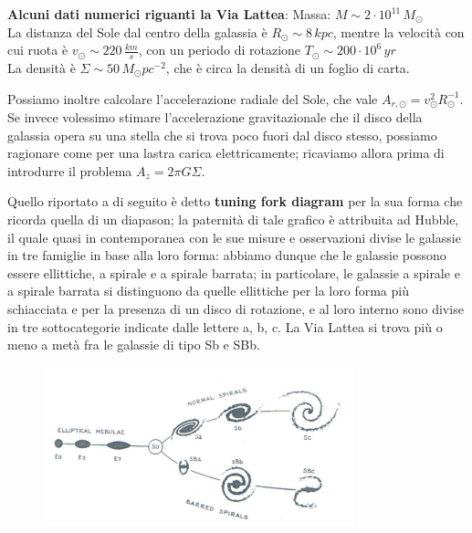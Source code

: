 \begin{minipage}{.65\textwidth}
\textbf{Alcuni dati numerici riguanti la Via Lattea}:
Massa: $M \sim 2 \cdot 10^{11} \, M_{\odot}$\\
La distanza del Sole dal centro della galassia è $R_{\odot} \sim 8 \, kpc$, mentre la velocità con cui ruota è $v_{\odot} \sim 220 \, \frac{km}{s}$, con un periodo di rotazione $T_{\odot} \sim 200 \cdot 10^6 \, yr$\\
La densità è $\Sigma \sim 50 \, M_{\odot}pc^{-2}$, che è circa la densità di un foglio di carta.\\
\end{minipage}

\vspace{0.2cm}

Possiamo inoltre calcolare l'accelerazione radiale del Sole, che vale $A_{r, \odot}= v_{\odot}^2 R_{\odot}^{-1}$. Se invece volessimo stimare l'accelerazione gravitazionale che il disco della galassia opera su una stella che si trova poco fuori dal disco stesso, possiamo ragionare come per una lastra carica elettricamente; ricaviamo allora prima di introdurre il problema $A_z = 2 \pi G \Sigma$.

Quello riportato a di seguito è detto \textbf{tuning fork diagram} per la sua forma che ricorda quella di un diapason; la paternità di tale grafico è attribuita ad Hubble, il quale quasi in contemporanea con le sue misure e osservazioni divise le galassie in tre famiglie in base alla loro forma: abbiamo dunque che le galassie possono essere ellittiche, a spirale e a spirale barrata; in particolare, le galassie a spirale e a spirale barrata si distinguono da quelle ellittiche per la loro forma più schiacciata e per la presenza di un disco di rotazione, e al loro interno sono divise in tre sottocategorie indicate dalle lettere a, b, c. La Via Lattea si trova più o meno a metà fra le galassie di tipo Sb e SBb.

\begin{figure}[!h]
\centering
\includegraphics[width=0.8\textwidth]{Img/bertin_20.png}
\end{figure}

